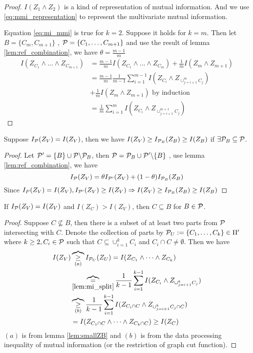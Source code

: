 \documentclass{article}
\begin{document}
\begin{proof}
$I(Z_1 \wedge Z_2)$ is a kind of representation of mutual information.
And we use \eqref{eq:mmi_representation} to represent the multivariate mutual information.

Equation \eqref{eq:mi_mmi} is true for $k=2$. Suppose it holds for $k=m$. Then
let $B=\{C_m, C_{m+1}\}$ , $\P=\{C_1, \dots, C_{m+1}\}$
and use the result of lemma \ref{lem:ref_combination}, 
we have $\theta = \frac{m-1}{m}$
\begin{align*}
I(Z_{C_1} \wedge \dots \wedge Z_{C_{m+1}}) & = 
 \frac{m-1}{m} I(Z_{C_1} \wedge \dots \wedge Z_{C_m})
+ \frac{1}{m}  I(Z_{m} \wedge Z_{m+1}) \\
& = \frac{m-1}{m} \frac{1}{m-1}\sum_{i=1}^{m-1} I(Z_{C_i} \wedge Z_{\cup_{j=i+1}^m C_j})\\
& + \frac{1}{m}  I(Z_{m} \wedge Z_{m+1})\textrm{ by induction} \\
& = \frac{1}{m} \sum_{i=1}^{m} I(Z_{C_i} \wedge Z_{\cup_{j=i+1}^{m+1} C_j})
\end{align*}
\end{proof}

\begin{lemma}\label{lem:smallZB}
Suppose $I_{\P}(Z_V) = I(Z_V)$, then we have $I(Z_V) \geq I_{\P_B}(Z_B) \geq I(Z_B)$ if $\exists \P_B \subseteq \P$.
\end{lemma}
\begin{proof}
Let $\P' = \{B\} \cup \P\backslash \P_B$, then $\P = \P_B \cup \P'\backslash\{B\}$ , use lemma \ref{lem:ref_combination}, we have
\begin{equation}
I_{\P}(Z_V) = \theta I_{\P'}(Z_V) + (1-\theta) I_{\P_B}(Z_B)
\end{equation}
Since  $I_{P}(Z_V) = I(Z_V), I_{\P'}(Z_V)\geq I(Z_V) \Rightarrow I(Z_V) \geq I_{\P_B}(Z_B) \geq I(Z_B)$ 
\end{proof}
\begin{lemma}\label{lem:LargeIZV}
	If $I_{\P}(Z_V)=I(Z_V)$ and $I(Z_C) > I(Z_V)$, then $C\subseteq B$ for $B \in \P$.
\end{lemma}
\begin{proof}
	Suppose $C \not\subseteq B$, then there is a subset of at least two parts from $\P$ intersecting with $C$. Denote the collection of parts by $\P_U :=\{C_1, \dots, C_k\} \in \Pi'$ where 
	$k \geq 2, C_i \in \P $ such that $C \subseteq \cup_{i=1}^k C_i$ and $C_i \cap C \neq \emptyset$.
	Then we have
\begin{align*}
	I(Z_V) & \overbrace{\geq}_{(a)} I_{\P_U}(Z_U)  = I(Z_{C_1} \wedge \dots \wedge Z_{C_k})\\
	& \overbrace{=}_{\ref{lem:mi_split}} {1\over k-1}\sum_{i=1}^{k-1} I(Z_{C_i} \wedge Z_{\cup_{j=i+1}^k C_j}) \\
	& \overbrace{\geq}_{(b)} \frac{1}{k-1}\sum_{i=1}^{k-1} I(Z_{C_i \cap C} \wedge Z_{\cup_{j=i+1}^k C_j \cap C}) \\
	& = I(Z_{C_1 \cap C} \wedge \dots \wedge Z_{C_k \cap C}) \geq I(Z_C)
\end{align*}
$(a)$ is from lemma \ref{lem:smallZB} and $(b)$ is from the data processing inequality of mutual information (or the restriction of graph cut function).
\end{proof}
\end{document}
